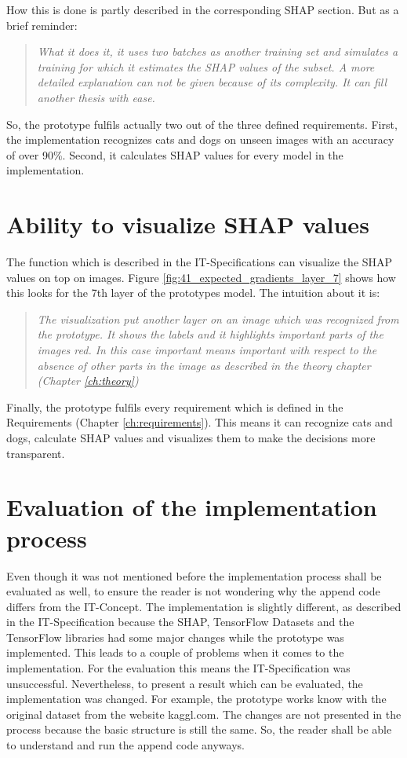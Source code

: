 How this is done is partly described in the corresponding SHAP section. But as a brief reminder:

\begin{quote}
	\textit{What it does it, it uses two batches as another training set and simulates a training for which it estimates the SHAP values of the subset. A more detailed explanation can not be given because of its complexity. It can fill another thesis with ease.}
\end{quote}

So, the prototype fulfils actually two out of the three defined requirements. First, the implementation recognizes cats and dogs on unseen images with an accuracy of over 90\%. Second, it calculates SHAP values for every model in the implementation.

\section{Ability to visualize SHAP values}

The function which is described in the IT-Specifications can visualize the SHAP values on top on images. Figure \ref{fig:41_expected_gradients_layer_7} shows how this looks for the 7th layer of the prototypes model. The intuition about it is:

\begin{quote}
\textit{The visualization put another layer on an image which was recognized from the prototype. It shows the labels and it highlights important parts of the images red. In this case important means important with respect to the absence of other parts in the image as described in the theory chapter (Chapter \ref{ch:theory})}
\end{quote} 

Finally, the prototype fulfils every requirement which is defined in the Requirements (Chapter \ref{ch:requirements}). This means it can recognize cats and dogs, calculate SHAP values and visualizes them to make the decisions more transparent.  

\section{Evaluation of the implementation process}

Even though it was not mentioned before the implementation process shall be evaluated as well, to ensure the reader is not wondering why the append code differs from the IT-Concept. The implementation is slightly different, as described in the IT-Specification because the SHAP, TensorFlow Datasets and the TensorFlow libraries had some major changes while the prototype was implemented. This leads to a couple of problems when it comes to the implementation. For the evaluation this means the IT-Specification was unsuccessful. Nevertheless, to present a result which can be evaluated, the implementation was changed. For example, the prototype works know with the original dataset from the website kaggl.com. The changes are not presented in the process because the basic structure is still the same. So, the reader shall be able to understand and run the append code anyways. 